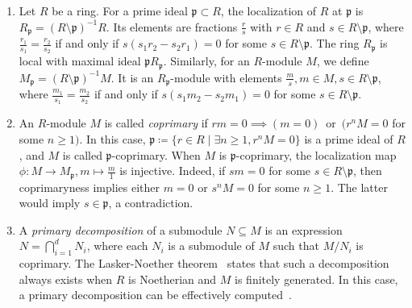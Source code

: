 \documentclass[letterpaper, 11pt, thm-restate]{article}
\numberwithin{equation}{section}
\newcommand{\frp}{\mathfrak{p}}
\theoremstyle{definition}
\theoremstyle{definition}
\theoremstyle{definition}
\begin{document}
    \begin{enumerate}[nosep, label=(\roman*)]
        \item Let $R$ be a ring. For a prime ideal $\frp\subset R$, the localization of $R$ at $\frp$ is $R_{\frp}=(R\setminus\frp)^{-1}R$.
        Its elements are fractions $\frac{r}{s}$ with $r\in R$ and $s\in R\setminus\frp$, where $\frac{r_1}{s_1} = \frac{r_2}{s_2}$ if and only if $s(s_1 r_2 - s_2 r_1) = 0$ for some $s \in R \setminus \frp$.
        The ring $R_{\frp}$ is local with maximal ideal $\frp R_{\frp}$.
        Similarly, for an $R$-module $M$, we define $M_{\frp} = (R \setminus \frp)^{-1} M$.
        It is an $R_{\frp}$-module with elements $\frac{m}{s}, m \in M, s \in R \setminus \frp$, where $\frac{m_1}{s_1} = \frac{m_2}{s_2}$ if and only if $s(s_1 m_2 - s_2 m_1) = 0$ for some $s \in R \setminus \frp$.
        \item An $R$-module $M$ is called \emph{coprimary} if $rm = 0 \implies (m = 0) \,\text{ or }\, (r^nM=0$ for some $n \geq 1)$.
        In this case, $\frp \coloneqq \{r \in R \mid \exists n \geq 1, r^nM=0\}$ is a prime ideal of $R$, and $M$ is called $\frp$-coprimary.
        When $M$ is $\frp$-coprimary, the localization map $\phi \colon M\rightarrow M_\frp, m \mapsto \frac{m}{1}$ is injective.
        Indeed, if $sm=0$ for some $s\in R \setminus \frp$, then coprimaryness implies either $m=0$ or $s^nM=0$ for some $n\geq1$. The latter would imply $s\in\frp$, a contradiction.
        \item A \emph{primary decomposition} of a submodule $N \subseteq M$ is an expression $N = \bigcap_{i = 1}^d N_i$, where each $N_i$ is a submodule of $M$ such that $M/N_i$ is coprimary.
        The Lasker-Noether theorem~\cite[Theorem~3.10]{eisenbud2013commutative} states that such a decomposition always exists when $R$ is Noetherian and $M$ is finitely generated.
        In this case, a primary decomposition can be effectively computed~\cite{rutman1992grobner}.
    \end{enumerate}
\end{document}
